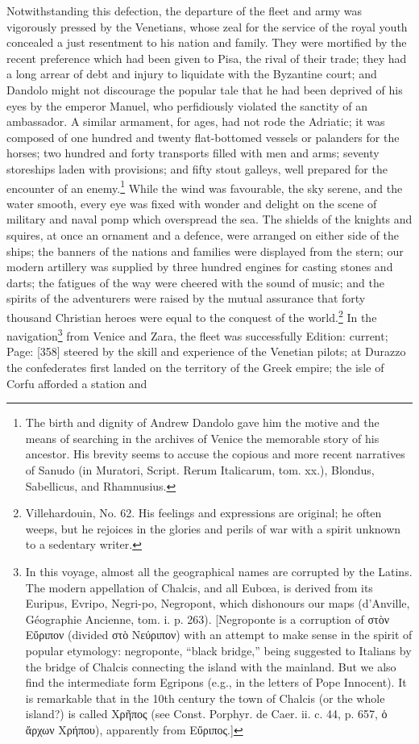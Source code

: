 Notwithstanding this defection, the departure of the fleet and army was vigorously pressed by the Venetians, whose zeal for the service of the royal youth concealed a just resentment to his nation and family. They were mortified by the recent preference which had been given to Pisa, the rival of their trade; they had a long arrear of debt and injury to liquidate with the Byzantine court; and Dandolo might not discourage the popular tale that he had been deprived of his eyes by the emperor Manuel, who perfidiously violated the sanctity of an ambassador. A similar armament, for ages, had not rode the Adriatic; it was composed of one hundred and twenty flat-bottomed vessels or palanders for the horses; two hundred and forty transports filled with men and arms; seventy storeships laden with provisions; and fifty stout galleys, well prepared for the encounter of an enemy.\footnote{The birth and dignity of Andrew Dandolo gave him the motive and the means of searching in the archives of Venice the memorable story of his ancestor. His brevity seems to accuse the copious and more recent narratives of Sanudo (in Muratori, Script. Rerum Italicarum, tom. xx.), Blondus, Sabellicus, and Rhamnusius.} While the wind was favourable, the sky serene, and the water smooth, every eye was fixed with wonder and delight on the scene of military and naval pomp which overspread the sea. The shields of the knights and squires, at once an ornament and a defence, were arranged on either side of the ships; the banners of the nations and families were displayed from the stern; our modern artillery was supplied by three hundred engines for casting stones and darts; the fatigues of the way were cheered with the sound of music; and the spirits of the adventurers were raised by the mutual assurance that forty thousand Christian heroes were equal to the conquest of the world.\footnote{Villehardouin, No. 62. His feelings and expressions are original; he often weeps, but he rejoices in the glories and perils of war with a spirit unknown to a sedentary writer.} In the navigation\footnote{In this voyage, almost all the geographical names are corrupted by the Latins. The modern appellation of Chalcis, and all Eubœa, is derived from its Euripus, Evripo, Negri-po, Negropont, which dishonours our maps (d\texthebrew{}’Anville, Géographie Ancienne, tom. i. p. 263). [Negroponte is a corruption of \textgreek{στ\texthebrew{ὸ}ν Ε\texthebrew{ὔ}ριπον} (divided \textgreek{στ\texthebrew{ὸ} Νεύριπον}) with an attempt to make sense in the spirit of popular etymology: negroponte, \texthebrew{“}black bridge,\texthebrew{}” being suggested to Italians by the bridge of Chalcis connecting the island with the mainland. But we also find the intermediate form Egripons (e.g., in the letters of Pope Innocent). It is remarkable that in the 10th century the town of Chalcis (or the whole island?) is called \textgreek{Χρ\texthebrew{ῆ}πος} (see Const. Porphyr. de Caer. ii. c. 44, p. 657, \textgreek{\texthebrew{ὁ ἄ}ρχων Χρήπου}), apparently from \textgreek{Ε\texthebrew{ὔ}ριπος}.]} from Venice and Zara, the fleet was successfully Edition: current; Page: [358] steered by the skill and experience of the Venetian pilots; at Durazzo the confederates first landed on the territory of the Greek empire; the isle of Corfu afforded a station and 